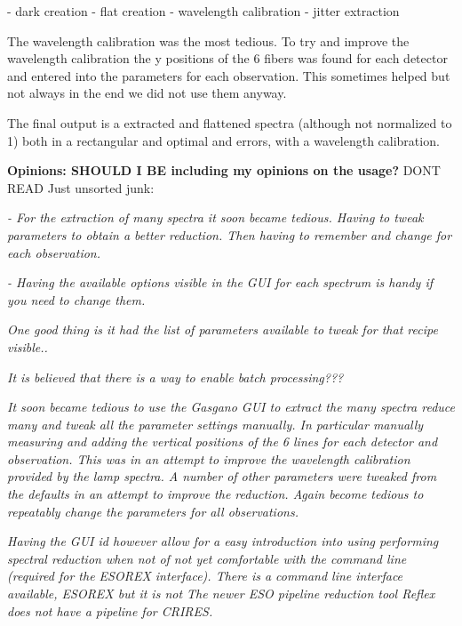 - dark creation
- flat creation
- wavelength calibration
- jitter extraction

The wavelength calibration was the most tedious. To try and improve the wavelength calibration the y positions of the 6 \thar fibers was found for each detector and entered into the parameters for each observation. This sometimes helped but not always in the end we did not use them anyway.

The final output is a extracted and flattened spectra (although not normalized to 1) both in a rectangular and optimal and errors, with a wavelength calibration.

\textbf{Opinions: SHOULD I BE including my opinions on the usage?}
DONT READ Just unsorted junk: 

\textit{- For the extraction of many spectra it soon became tedious. Having to tweak parameters to obtain a better reduction. Then having to remember and change for each observation. }

\textit{- Having the available options visible in the GUI for each spectrum is handy if you need to change them.}



\textit{One good thing is it had the list of parameters available to tweak for that recipe visible..}

\textit{It is believed that there is a way to enable batch processing???}

\textit{It soon became tedious to use the Gasgano GUI to extract the many spectra reduce many and tweak all the parameter settings manually. In particular manually measuring and adding the vertical positions of the 6 \thar lines for each detector and observation. This was in an attempt to improve the wavelength calibration provided by the \thar lamp spectra.
A number of other parameters were tweaked from the defaults in an attempt to improve the reduction. Again become tedious to repeatably change the parameters for all observations.}

\textit{Having the GUI id however allow for a easy introduction into using performing spectral reduction when not of not yet comfortable with the command line (required for the ESOREX interface).
There is a command line interface available, ESOREX but it is not The newer ESO pipeline reduction tool Reflex does not have a pipeline for CRIRES. }


